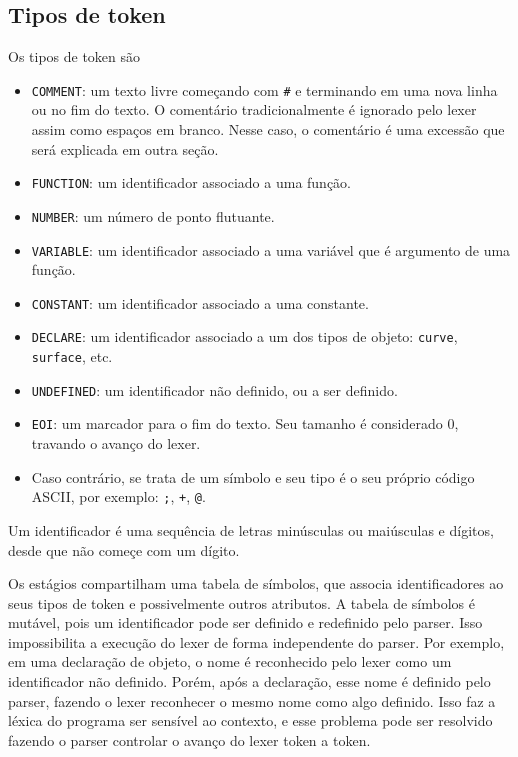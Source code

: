 \documentclass[10pt,a4paper]{article}
\begin{document}
\subsection{Tipos de token}
Os tipos de token são
\begin{itemize}
\item \texttt{COMMENT}: um texto livre começando com \texttt{\#} e terminando em uma nova linha ou no fim do texto.
O comentário tradicionalmente é ignorado pelo lexer assim como espaços em branco.
Nesse caso, o comentário é uma excessão que será explicada em outra seção.
\item \texttt{FUNCTION}: um identificador associado a uma função.
\item \texttt{NUMBER}: um número de ponto flutuante.
\item \texttt{VARIABLE}: um identificador associado a uma variável que é argumento de uma função.
\item \texttt{CONSTANT}: um identificador associado a uma constante.
\item \texttt{DECLARE}: um identificador associado a um dos tipos de objeto: \texttt{curve}, \texttt{surface}, etc.
\item \texttt{UNDEFINED}: um identificador não definido, ou a ser definido.
\item \texttt{EOI}: um marcador para o fim do texto. Seu tamanho é considerado 0, travando o avanço do lexer.
\item Caso contrário, se trata de um símbolo e seu tipo é o seu próprio código ASCII, por exemplo: \texttt{;}, \texttt{+}, \texttt{@}.
\end{itemize}

Um identificador é uma sequência de letras minúsculas ou maiúsculas e dígitos, desde que não começe com um dígito.

Os estágios compartilham uma tabela de símbolos, que associa identificadores ao seus tipos de token
e possivelmente outros atributos. A tabela de símbolos é mutável, pois um identificador pode ser
definido e redefinido pelo parser. Isso impossibilita a execução do lexer de forma independente do parser.
Por exemplo, em uma declaração de objeto, o nome é reconhecido pelo lexer como um identificador não definido.
Porém, após a declaração, esse nome é definido pelo parser, fazendo o lexer reconhecer o mesmo nome como algo definido. 
Isso faz a léxica do programa ser sensível ao contexto, e esse problema pode ser resolvido fazendo o parser controlar o 
avanço do lexer token a token.
\end{document}
